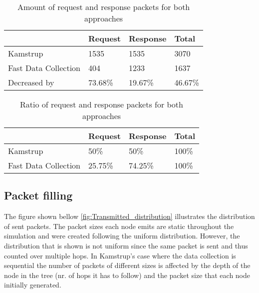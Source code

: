 \begin{table}[H]
\begin{center}
    \begin{tabular}{ | l | l | l | l |}
    \hline
    & Request & Response & Total \\ \hline
    Kamstrup & 1535 & 1535 & 3070 \\ \hline
    Fast Data Collection & 404 & 1233 & 1637 \\ \hline
    Decreased by & 73.68\% & 19.67\% & 46.67\% \\ \hline
    \end{tabular}
\end{center}
\caption{Amount of request and response packets for both approaches}
\label{tab:packet_amount}
\end{table}

\begin{table}[H]
\begin{center}
    \begin{tabular}{ | l | l | l | l |}
    \hline
    & Request & Response & Total \\ \hline
    Kamstrup & 50\% & 50\% & 100\% \\ \hline
    Fast Data Collection & 25.75\% & 74.25\% & 100\% \\ \hline
    \end{tabular}
\end{center}
\caption{Ratio of request and response packets for both approaches}
\label{tab:packet_ratio}
\end{table}

\subsection{Packet filling}

The figure shown bellow \ref{fig:Transmitted_distribution} illustrates the distribution of sent packets. The packet sizes each node emits are static throughout the simulation and were created following the uniform distribution. However, the distribution that is shown is not uniform since the same packet is sent and thus counted over multiple hops. In Kamstrup's case where the data collection is sequential the number of packets of different sizes is affected by the depth of the node in the tree (nr. of hops it has to follow) and the packet size that each node initially generated.


